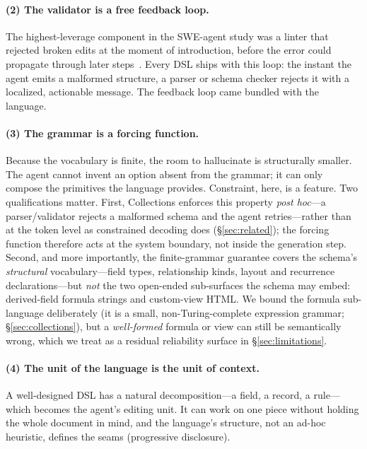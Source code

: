 \documentclass[11pt]{article}
\begin{document}
\paragraph{(2) The validator is a free feedback loop.}
The highest-leverage component in the SWE-agent study was a linter that rejected
broken edits at the moment of introduction, before the error could propagate
through later steps~\citep{yang2024sweagent}. Every DSL ships with this loop:
the instant the agent emits a malformed structure, a parser or schema checker
rejects it with a localized, actionable message. The feedback loop came bundled
with the language.

\paragraph{(3) The grammar is a forcing function.}
Because the vocabulary is finite, the room to hallucinate is structurally smaller.
The agent cannot invent an option absent from the grammar; it can only compose the
primitives the language provides. Constraint, here, is a feature. Two
qualifications matter. First, Collections enforces this property
\emph{post hoc}---a parser/validator rejects a malformed schema and the agent
retries---rather than at the token level as constrained decoding does
(\S\ref{sec:related}); the forcing function therefore acts at the system boundary,
not inside the generation step. Second, and more importantly, the finite-grammar
guarantee covers the schema's \emph{structural} vocabulary---field types,
relationship kinds, layout and recurrence declarations---but \emph{not} the two
open-ended sub-surfaces the schema may embed: derived-field formula strings and
custom-view HTML. We bound the formula sub-language deliberately (it is a small,
non-Turing-complete expression grammar; \S\ref{sec:collections}), but a
\emph{well-formed} formula or view can still be semantically wrong, which we treat
as a residual reliability surface in \S\ref{sec:limitations}.

\paragraph{(4) The unit of the language is the unit of context.}
A well-designed DSL has a natural decomposition---a field, a record, a rule---which
becomes the agent's editing unit. It can work on one piece without holding the
whole document in mind, and the language's structure, not an ad-hoc heuristic,
defines the seams (progressive disclosure).
\end{document}
